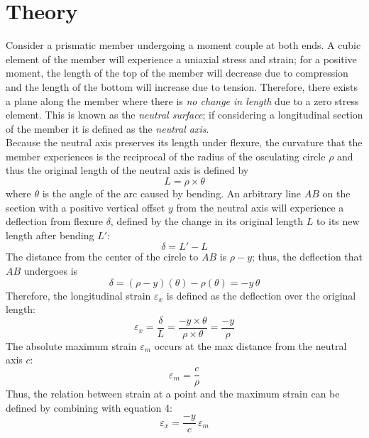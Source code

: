 \documentclass{article}
\begin{document}
    \section{Theory}
    \noindent Consider a prismatic member undergoing a moment couple at both ends. A cubic element of the member will experience a uniaxial stress and strain; for a positive moment, the length of the top of the member will decrease due to compression and the length of the bottom will increase due to tension. Therefore, there exists a plane along the member where there is \emph{no change in length} due to a zero stress element. This is known as the \emph{neutral surface}; if considering a longitudinal section of the member it is defined as the \emph{neutral axis}.  \\
    Because the neutral axis preserves its length under flexure, the curvature that the member experiences is the reciprocal of the radius of the osculating circle $\rho$ and thus the original length of the neutral axis is defined by 
    \begin{equation*}
    L = \rho\times\theta 
    \end{equation*}
    where $\theta$ is the angle of the arc caused by bending. An arbitrary line $AB$ on the section with a positive vertical offset $y$ from the neutral axis will experience a deflection from flexure $\delta$, defined by the change in its original length $L$ to its new length after bending $L'$:
    \begin{equation*}
    \delta = L'-L 
    \end{equation*}
    The distance from the center of the circle to $AB$ is $\rho - y$; thus, the deflection that $AB$ undergoes is
    \begin{equation*}
        \delta = (\rho - y)(\theta) - \rho(\theta) = -y\,\theta 
    \end{equation*}
    Therefore, the longitudinal strain $\varepsilon_x$ is defined as the deflection over the original length:
    \begin{equation*}
        \varepsilon_x = \frac{\delta}{L} = \frac{-y\times\theta}{\rho\times\theta} = \frac{-y}{\rho}
    \end{equation*}
    The absolute maximum strain $\varepsilon_m$ occurs at the max distance from the neutral axis $c$:
    \[\varepsilon_m = \frac{c}{\rho}\]
    Thus, the relation between strain at a point and the maximum strain can be defined by combining with equation 4:
    \begin{equation*}
        \varepsilon_x = \frac{-y}{c}\,\varepsilon_m
    \end{equation*}
\end{document}
